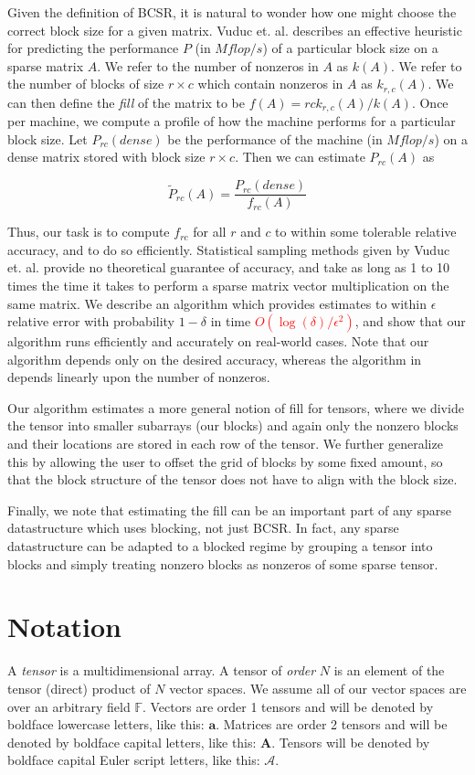 \documentclass[12pt]{article}
\newcommand{\todo}[1] {\textbf{\textcolor{red}{#1}}}
\renewcommand{\vec}[1] {\mathbf{#1}}
\newcommand{\Mat}[1] {\mathbf{#1}}
\newcommand{\Ten}[1] {\mathbf{\mathcal{#1}}}
\newcommand{\F} {\mathbb{F}}
\begin{document}
  Given the definition of BCSR, it is natural to wonder how one might choose the correct block size for a given matrix.
  Vuduc et. al. describes an effective heuristic for predicting the performance $P$ (in $Mflop/s$) of a particular block size on a sparse matrix $A$.
  We refer to the number of nonzeros in $A$ as $k(A)$. We refer to the number of blocks of size $r \times c$ which contain nonzeros in $A$ as $k_{r, c}(A)$.
  We can then define the \textit{fill} of the matrix to be $f(A) = rck_{r, c}(A)/k(A)$.
  Once per machine, we compute a profile of how the machine performs for a particular block size.
  Let $P_{rc}(dense)$ be the performance of the machine (in $Mflop/s$) on a dense matrix stored with block size $r \times c$.
  Then we can estimate $P_{rc}(A)$ as

  \[
    \tilde{P}_{rc}(A) = \frac{P_{rc}(dense)}{f_{rc}(A)}
  \]

  Thus, our task is to compute $f_{rc}$ for all $r$ and $c$ to within some tolerable relative accuracy, and to do so efficiently. Statistical sampling methods given by Vuduc et. al. provide no theoretical guarantee of accuracy, and take as long as 1 to 10 times the time it takes to perform a sparse matrix vector multiplication on the same matrix. We describe an algorithm which provides estimates to within $\epsilon$ relative error with probability $1 - \delta$ in time \todo{$O(\log(\delta)/\epsilon^2)$}, and show that our algorithm runs efficiently and accurately on real-world cases. Note that our algorithm depends only on the desired accuracy, whereas the algorithm in \cite{vuduc2003} depends linearly upon the number of nonzeros.

  Our algorithm estimates a more general notion of fill for tensors, where we divide the tensor into smaller subarrays (our blocks) and again only the nonzero blocks and their locations are stored in each row of the tensor. We further generalize this by allowing the user to offset the grid of blocks by some fixed amount, so that the block structure of the tensor does not have to align with the block size.

  Finally, we note that estimating the fill can be an important part of any sparse datastructure which uses blocking, not just BCSR. In fact, any sparse datastructure can be adapted to a blocked regime by grouping a tensor into blocks and simply treating nonzero blocks as nonzeros of some sparse tensor.

  \section{Notation}
    A \textit{tensor} is a multidimensional array. A tensor of \textit{order} $N$ is an element of the tensor (direct) product of $N$ vector spaces. We assume all of our vector spaces are over an arbitrary field $\F$. Vectors are order 1 tensors and will be denoted by boldface lowercase letters, like this: $\vec{a}$. Matrices are order 2 tensors and will be denoted by boldface capital letters, like this: $\Mat{A}$. Tensors will be denoted by boldface capital Euler script letters, like this: $\Ten{A}$.
\end{document}
